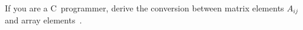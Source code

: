   If you are a C~programmer, derive the conversion between matrix
  elements $A_{ij}$ and array elements~.
